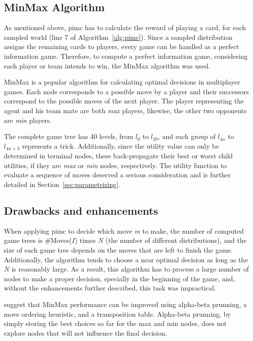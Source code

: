 \subsection{MinMax Algorithm}
As mentioned above, \ac{pimc} has to calculate the reward of playing a card, for each sampled world (line 7 of Algorithm~\ref{alg:pimc}).
Since a sampled distribution assigns the remaining cards to players, every game can be handled as a perfect information game.
Therefore, to compute a perfect information game, considering each player or team intends to win, the MinMax algorithm was used.

MinMax is a popular algorithm for calculating optimal decisions in multiplayer games.
Each node corresponds to a possible move by a player and their successors correspond to the possible moves of the next player.
The player representing the agent and his team mate are both \emph{max} players, likewise, the other two opponents are \emph{min} players.

The complete game tree has 40 levels, from $l_{0}$ to $l_{39}$, and each group of $l_{4n}$ to $l_{4n+3}$ represents a trick.
Additionally, since the utility value can only be determined in terminal nodes, these back-propagate their best or worst child utilities, if they are \emph{max} or \emph{min} nodes, respectively.
The utility function to evaluate a sequence of moves deserved a serious consideration and is further detailed in Section~\ref{sec:parametrizing}.


\subsection{Drawbacks and enhancements}
When applying \ac{pimc} to decide which move \emph{m} to make, the number of computed game trees is \#Moves($I$) times $N$ (the number of different distributions), and the size of each game tree depends on the moves that are left to finish the game.
Additionally, the algorithm tends to choose a near optimal decision as long as the $N$ is reasonably large.
As a result, this algorithm has to process a large number of nodes to make a proper decision, specially in the beginning of the game, and, without the enhancements further described, this task was impractical.

\citet*{Russell2009} suggest that MinMax performance can be improved using alpha-beta prunning, a move ordering heuristic, and a transposition table.
Alpha-beta prunning, by simply storing the best choices so far for the max and min nodes, does not explore nodes that will not influence the final decision.

